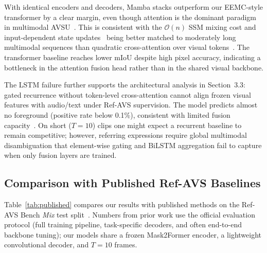 \documentclass[a4paper,12pt]{extarticle}
\begin{document}
With identical encoders and decoders, Mamba stacks outperform our EEMC-style transformer by a clear margin, even though attention is the dominant paradigm in multimodal AVSU~\cite{tsai2019multimodal, zorro2023, maavt2024}. This is consistent with the $\mathcal{O}(n)$ SSM mixing cost and input-dependent state updates~\cite{dao2024mamba} being better matched to moderately long multimodal sequences than quadratic cross-attention over visual tokens~\cite{tay2020efficient}. The transformer baseline reaches lower mIoU despite high pixel accuracy, indicating a bottleneck in the attention fusion head rather than in the shared visual backbone.

The LSTM failure further supports the architectural analysis in Section~3.3: gated recurrence without token-level cross-attention cannot align frozen visual features with audio/text under Ref-AVS supervision. The model predicts almost no foreground (positive rate below 0.1\%), consistent with limited fusion capacity~\cite{bengio1994learning, hochreiter1997long}. On short ($T{=}10$) clips one might expect a recurrent baseline to remain competitive; however, referring expressions require global multimodal disambiguation that element-wise gating and BiLSTM aggregation fail to capture when only fusion layers are trained.

\subsection{Comparison with Published Ref-AVS Baselines}

Table~\ref{tab:published} compares our results with published methods on the Ref-AVS Bench \emph{Mix} test split~\cite{wang2024refavs, tsam2025, avsegformer2023}. Numbers from prior work use the official evaluation protocol (full training pipeline, task-specific decoders, and often end-to-end backbone tuning); our models share a frozen Mask2Former encoder, a lightweight convolutional decoder, and $T{=}10$ frames.
\end{document}

